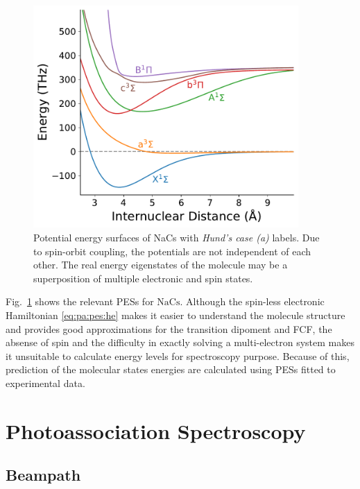 \begin{figure}
  \centering
  \includegraphics[width=0.9\textwidth]{figures/pa_pes.pdf}
  \caption[NaCs potential energy surfaces]{
    Potential energy surfaces of NaCs with \textit{Hund's case (a)} labels.
    Due to spin-orbit coupling, the potentials are not independent of each other.
    The real energy eigenstates of the molecule may be a superposition of multiple
    electronic and spin states.
    \label{fig:pa:pes}}
\end{figure}

Fig.~\ref{fig:pa:pes} shows the relevant PESs for $\mathrm{NaCs}$.
Although the spin-less electronic Hamiltonian \ref{eq:pa:pes:he} makes it easier
to understand the molecule structure and provides good approximations for the
transition dipoment and FCF, the absense of spin and the difficulty in exactly solving
a multi-electron system makes it unsuitable to calculate energy levels
for spectroscopy purpose.
Because of this, prediction of the molecular states energies are calculated using
PESs fitted to experimental data\cite{docenko_coupling_2006,zaharova_solution_2009,grochola_spin-forbidden_2011,grochola_investigation_2010}.

\section{Photoassociation Spectroscopy}
\label{ch:pa:pa}

\subsection{Beampath}
\label{ch:pa:beampath}

